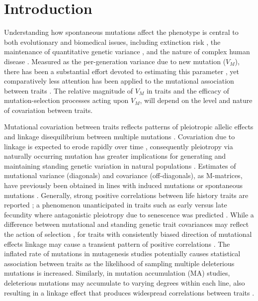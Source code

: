 \section{Introduction}

Understanding how spontaneous mutations affect the phenotype is central to both evolutionary and biomedical issues, including extinction risk \citep{Land94, lync95,Loew06}, the maintenance of quantitative genetic variance \citep{Burg00, John05}, and the nature of complex human disease \citep{John20}. Measured as the per-generation variance due to new mutation ($V_M$), there has been a substantial effort devoted to estimating this parameter \citep[][Chapter 2]{Houl96, Hall09, Wals18}, yet comparatively less attention has been applied to the mutational association between traits \citep{Jone03,Jone07,Este06}. The relative magnitude of $V_M$ in traits and the efficacy of mutation-selection processes acting upon $V_M$, will depend on the level and nature of covariation between traits. \par
Mutational covariation between traits reflects patterns of pleiotropic allelic effects and linkage disequilibrium between multiple mutations \citep{Land80,Falc96,Phil06}. Covariation due to linkage is expected to erode rapidly over time \citep{Land80}, consequently pleiotropy via naturally occurring mutation has greater implications for generating and maintaining standing genetic variation in natural populations \citep{John05}. Estimates of mutational variance (diagonals) and covariance (off-diagonals), as M-matrices, have previously been obtained in lines with induced mutations \citealp{Cama00, Keig00} or spontaneous mutations \citep[e.g.,][]{Houl94, Este04,Mall23}. Generally, strong positive correlations between life history traits are reported \citep{Houl94, Keig00,Este06}; a phenomenon unanticipated in traits such as early versus late fecundity where antagonistic pleiotropy due to senescence was predicted \citep{Houl94}. While a difference between mutational and standing genetic trait covariances may reflect the action of selection \citep{Este06}, for traits with consistently biased direction of mutational effects \citep[i.e., mutations typically decrease fitness:][]{Hall09} linkage may cause a transient pattern of positive correlations \citep{Keig00}. The inflated rate of mutations in mutagenesis studies potentially causes statistical association between traits as the likelihood of sampling multiple deleterious mutations is increased. Similarly, in mutation accumulation (MA) studies, deleterious mutations may accumulate to varying degrees within each line, also resulting in a linkage effect that produces widespread correlations between traits \citep{Keig00}. \par

